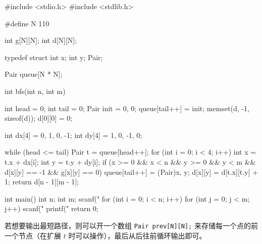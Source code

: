 \begin{mycpptwocol}
    #include <stdio.h>
    #include <stdlib.h>

    #define N 110

    int g[N][N];
    int d[N][N];

    typedef struct {
        int x;
        int y;
    } Pair;

    Pair queue[N * N];

    int bfs(int n, int m)
        {
        int head = 0;
        int tail = 0;
        Pair init = {0, 0};
        queue[tail++] = init;
        memset(d, -1, sizeof(d));
        d[0][0] = 0;

        int dx[4] = {0, 1, 0, -1};
        int dy[4] = {1, 0, -1, 0};

        while (head <= tail) {
            Pair t = queue[head++];
            for (int i = 0; i < 4; i++) {
                int x = t.x + dx[i];
                int y = t.y + dy[i];
                if (x >= 0 && x < n && y >= 0 && y < m && d[x][y] == -1 && g[x][y] == 0) {
                    queue[tail++] = (Pair){x, y};
                    d[x][y] = d[t.x][t.y] + 1;
                }
            }
        }
        return d[n - 1][m - 1];
    }

    int main()
        {
        int n;
        int m;
        scanf("%
        for (int i = 0; i < n; i++) {
            for (int j = 0; j < m; j++) {
                scanf("%
            }
        }
        printf("%
        return 0;
    }
\end{mycpptwocol}

\begin{information}
    若想要输出最短路径，则可以开一个数组 \lstinline{Pair prev[N][N];} 来存储每一个点的前一个节点（在扩展 $t$ 时可以操作），最后从后往前循环输出即可。
\end{information}

